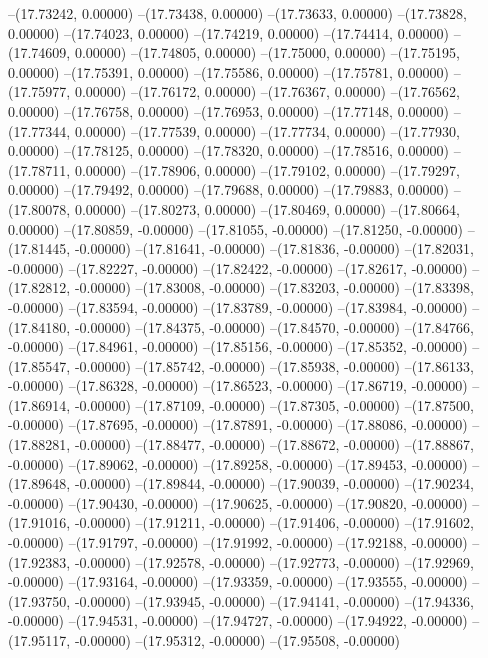 --(17.73242, 0.00000)
--(17.73438, 0.00000)
--(17.73633, 0.00000)
--(17.73828, 0.00000)
--(17.74023, 0.00000)
--(17.74219, 0.00000)
--(17.74414, 0.00000)
--(17.74609, 0.00000)
--(17.74805, 0.00000)
--(17.75000, 0.00000)
--(17.75195, 0.00000)
--(17.75391, 0.00000)
--(17.75586, 0.00000)
--(17.75781, 0.00000)
--(17.75977, 0.00000)
--(17.76172, 0.00000)
--(17.76367, 0.00000)
--(17.76562, 0.00000)
--(17.76758, 0.00000)
--(17.76953, 0.00000)
--(17.77148, 0.00000)
--(17.77344, 0.00000)
--(17.77539, 0.00000)
--(17.77734, 0.00000)
--(17.77930, 0.00000)
--(17.78125, 0.00000)
--(17.78320, 0.00000)
--(17.78516, 0.00000)
--(17.78711, 0.00000)
--(17.78906, 0.00000)
--(17.79102, 0.00000)
--(17.79297, 0.00000)
--(17.79492, 0.00000)
--(17.79688, 0.00000)
--(17.79883, 0.00000)
--(17.80078, 0.00000)
--(17.80273, 0.00000)
--(17.80469, 0.00000)
--(17.80664, 0.00000)
--(17.80859, -0.00000)
--(17.81055, -0.00000)
--(17.81250, -0.00000)
--(17.81445, -0.00000)
--(17.81641, -0.00000)
--(17.81836, -0.00000)
--(17.82031, -0.00000)
--(17.82227, -0.00000)
--(17.82422, -0.00000)
--(17.82617, -0.00000)
--(17.82812, -0.00000)
--(17.83008, -0.00000)
--(17.83203, -0.00000)
--(17.83398, -0.00000)
--(17.83594, -0.00000)
--(17.83789, -0.00000)
--(17.83984, -0.00000)
--(17.84180, -0.00000)
--(17.84375, -0.00000)
--(17.84570, -0.00000)
--(17.84766, -0.00000)
--(17.84961, -0.00000)
--(17.85156, -0.00000)
--(17.85352, -0.00000)
--(17.85547, -0.00000)
--(17.85742, -0.00000)
--(17.85938, -0.00000)
--(17.86133, -0.00000)
--(17.86328, -0.00000)
--(17.86523, -0.00000)
--(17.86719, -0.00000)
--(17.86914, -0.00000)
--(17.87109, -0.00000)
--(17.87305, -0.00000)
--(17.87500, -0.00000)
--(17.87695, -0.00000)
--(17.87891, -0.00000)
--(17.88086, -0.00000)
--(17.88281, -0.00000)
--(17.88477, -0.00000)
--(17.88672, -0.00000)
--(17.88867, -0.00000)
--(17.89062, -0.00000)
--(17.89258, -0.00000)
--(17.89453, -0.00000)
--(17.89648, -0.00000)
--(17.89844, -0.00000)
--(17.90039, -0.00000)
--(17.90234, -0.00000)
--(17.90430, -0.00000)
--(17.90625, -0.00000)
--(17.90820, -0.00000)
--(17.91016, -0.00000)
--(17.91211, -0.00000)
--(17.91406, -0.00000)
--(17.91602, -0.00000)
--(17.91797, -0.00000)
--(17.91992, -0.00000)
--(17.92188, -0.00000)
--(17.92383, -0.00000)
--(17.92578, -0.00000)
--(17.92773, -0.00000)
--(17.92969, -0.00000)
--(17.93164, -0.00000)
--(17.93359, -0.00000)
--(17.93555, -0.00000)
--(17.93750, -0.00000)
--(17.93945, -0.00000)
--(17.94141, -0.00000)
--(17.94336, -0.00000)
--(17.94531, -0.00000)
--(17.94727, -0.00000)
--(17.94922, -0.00000)
--(17.95117, -0.00000)
--(17.95312, -0.00000)
--(17.95508, -0.00000)
